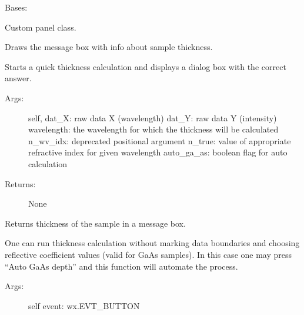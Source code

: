 \documentclass[letterpaper,10pt,english]{sphinxmanual}
\begin{document}

\begin{fulllineitems}
\label{\detokenize{GUI:GUI.MyPanel}}
Bases: 

Custom panel class.

\begin{fulllineitems}
\label{\detokenize{GUI:GUI.MyPanel.ShowMessage}}
Draws the message box with info about sample thickness.

Starts a quick thickness calculation and displays a dialog box with the correct answer.
\begin{description}
\item[{Args:}] \leavevmode
self,
dat\_X: raw data X (wavelength)
dat\_Y: raw data Y (intensity)
wavelength: the wavelength for which the thickness will be calculated
n\_wv\_idx: deprecated positional argument
n\_true: value of appropriate refractive index for given wavelength
auto\_ga\_as: boolean flag for auto calculation

\item[{Returns:}] \leavevmode
None

\end{description}

\end{fulllineitems}


\begin{fulllineitems}
\label{\detokenize{GUI:GUI.MyPanel.calc_auto}}
Returns thickness of the sample in a message box.

One can run thickness calculation without marking data boundaries
and choosing reflective coefficient values (valid for GaAs samples). 
In this case one may press “Auto GaAs depth” and this function will 
automate the process.
\begin{description}
\item[{Args:}] \leavevmode
self
event: wx.EVT\_BUTTON


\end{description}
\end{fulllineitems}
\end{fulllineitems}
\end{document}
